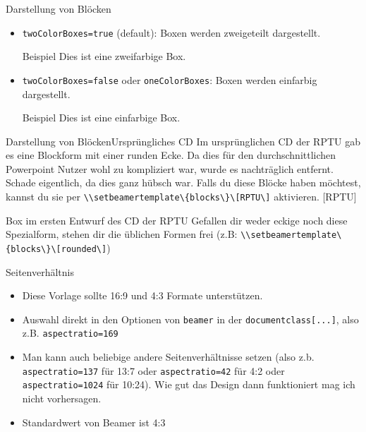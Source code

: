 \documentclass[german,10pt,xcolor=colortbl,compress
]{beamer}
\begin{document}
\begin{frame}{Darstellung von Blöcken}
	\begin{itemize}
		\item \lstinline!twoColorBoxes=true! (default): Boxen werden zweigeteilt dargestellt.
		      \begin{block}{Beispiel}
			      Dies ist eine zweifarbige Box.
		      \end{block}
		\item \lstinline!twoColorBoxes=false! oder \lstinline!oneColorBoxes!: Boxen werden einfarbig dargestellt.
		      \begin{block}{Beispiel}
			      Dies ist eine einfarbige Box.
		      \end{block}
	\end{itemize}\end{frame}
\begin{frame}{Darstellung von Blöcken}{Ursprüngliches CD}
	Im ursprünglichen CD der RPTU gab es eine Blockform mit einer runden Ecke. Da dies für den durchschnittlichen Powerpoint Nutzer wohl zu kompliziert war, wurde es nachträglich entfernt. Schade eigentlich, da dies ganz hübsch war. Falls du diese Blöcke haben möchtest, kannst du sie per \lstinline!\\setbeamertemplate\{blocks\}\[RPTU\]! aktivieren.
	[RPTU]
	\begin{block}{Box im ersten Entwurf des CD der RPTU}
		Gefallen dir weder eckige noch diese Spezialform, stehen dir die üblichen Formen frei (z.B: \lstinline!\\setbeamertemplate\{blocks\}\[rounded\]!)
	\end{block}
\end{frame}
\begin{frame}{Seitenverhältnis}
	\begin{itemize}
		\item Diese Vorlage sollte 16:9 und 4:3 Formate unterstützen.
		\item Auswahl direkt in den Optionen von \lstinline!beamer! in der \lstinline!documentclass[...]!, also z.B. \lstinline!aspectratio=169!
		\item Man kann auch beliebige andere Seitenverhältnisse setzen (also z.b. \lstinline!aspectratio=137! für 13:7 oder \lstinline!aspectratio=42! für 4:2 oder \lstinline!aspectratio=1024! für 10:24). Wie gut das Design dann funktioniert mag ich nicht vorhersagen.
		\item Standardwert von Beamer ist 4:3
	\end{itemize}
\end{frame}
\end{document}
